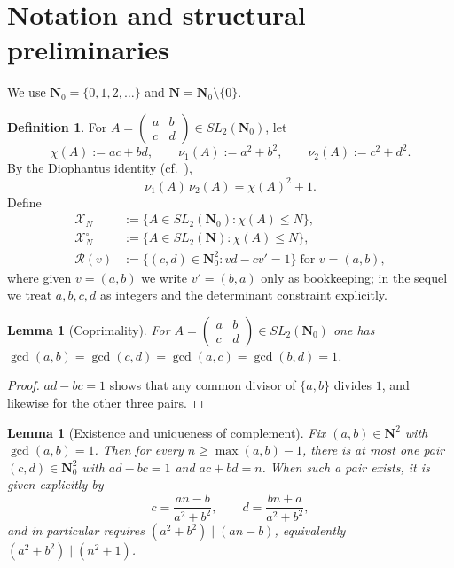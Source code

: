\documentclass[11pt]{article}
\newtheorem{lemma}[theorem]{Lemma}
\theoremstyle{definition}
\newtheorem{definition}[theorem]{Definition}
\newcommand{\N}{\mathbf{N}}
\newcommand{\Nz}{\mathbf{N}_0}
\newcommand{\SLNz}{SL_2(\Nz)}
\newcommand{\SLN}{SL_2(\N)}
\begin{document}
\section{Notation and structural preliminaries}\label{sec:prelim}

We use $\Nz=\{0,1,2,\ldots\}$ and $\N=\Nz\setminus\{0\}$.

\begin{definition}\label{def:chi-and-spaces}
For $A=\begin{pmatrix}a&b\\c&d\end{pmatrix}\in\SLNz$, let
\[
\chi(A):=ac+bd,\qquad\nu_{1}(A):=a^{2}+b^{2},\qquad
\nu_{2}(A):=c^{2}+d^{2}.
\]
By the Diophantus identity (cf.\ \cite[Lem.~1.5]{shakov}),
\begin{equation}\label{eq:diophantus}
\nu_{1}(A)\,\nu_{2}(A)=\chi(A)^{2}+1.
\end{equation}
Define
\begin{align*}
\mathcal{X}_{N}&:=\{A\in\SLNz:\chi(A)\le N\},\\
\mathcal{X}_{N}^{\circ}&:=\{A\in\SLN:\chi(A)\le N\},\\
\mathcal{R}(v)&:=\{(c,d)\in\Nz^{2}:vd-cv'=1\}\;\text{for }v=(a,b),
\end{align*}
where given $v=(a,b)$ we write $v'=(b,a)$ only as bookkeeping; in the
sequel we treat $a,b,c,d$ as integers and the determinant constraint
explicitly.
\end{definition}

\begin{lemma}[Coprimality]\label{lem:coprime}
For $A=\begin{pmatrix}a&b\\c&d\end{pmatrix}\in\SLNz$ one has
$\gcd(a,b)=\gcd(c,d)=\gcd(a,c)=\gcd(b,d)=1$.
\end{lemma}

\begin{proof}
$ad-bc=1$ shows that any common divisor of $\{a,b\}$ divides $1$, and
likewise for the other three pairs.
\end{proof}

\begin{lemma}[Existence and uniqueness of complement]
\label{lem:complement-of-row}
Fix $(a,b)\in\N^{2}$ with $\gcd(a,b)=1$. Then for every
$n\ge\max(a,b)-1$, there is at most one pair $(c,d)\in\Nz^{2}$ with
$ad-bc=1$ and $ac+bd=n$. When such a pair exists, it is given
explicitly by
\begin{equation}\label{eq:cd-formula}
c=\frac{an-b}{a^{2}+b^{2}},\qquad d=\frac{bn+a}{a^{2}+b^{2}},
\end{equation}
and in particular requires $(a^{2}+b^{2})\mid(an-b)$, equivalently
$(a^{2}+b^{2})\mid(n^{2}+1)$.
\end{lemma}
\end{document}
